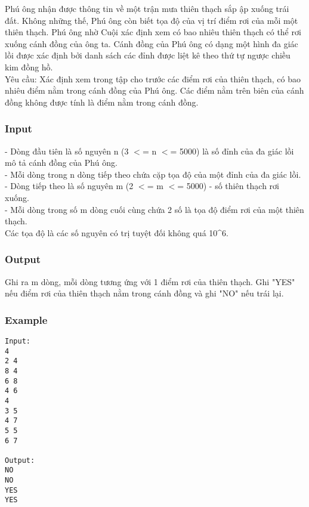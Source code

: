 



   Phú ông nhận được thông tin về một trận mưa thiên thạch sắp ập xuống trái đất. Không những thế, Phú ông còn biết tọa độ của vị trí điểm rơi của mỗi một thiên thạch. Phú ông nhờ Cuội xác định xem có bao nhiêu thiên thạch có thể rơi xuống cánh đồng của ông ta. Cánh đồng của Phú ông có dạng một hình đa giác lồi được xác định bởi danh sách các đỉnh được liệt kê theo thứ tự ngược chiều kim đồng hồ.   
\\       Yêu cầu:      Xác định xem trong tập cho trước các điểm rơi của thiên thạch, có bao nhiêu điểm nằm trong cánh đồng của Phú ông. Các điểm nằm trên biên của cánh đồng không được tính là điểm nằm trong cánh đồng.  

\subsubsection{   Input  }

   - Dòng đầu tiên là số nguyên n (3 $<$= n $<$= 5000) là số đỉnh của đa giác lồi mô tả cánh đồng của Phú ông.   
\\   - Mỗi dòng trong n dòng tiếp theo chứa cặp tọa độ của một đỉnh của đa giác lồi.   
\\   - Dòng tiếp theo là số nguyên m (2 $<$= m $<$= 5000) - số thiên thạch rơi xuống.   
\\   - Mỗi dòng trong số m dòng cuối cùng chứa 2 số là tọa độ điểm rơi của một thiên thạch.   
\\   Các tọa độ là các số nguyên có trị tuyệt đối không quá 10\textasciicircum6.  

\subsubsection{   Output  }

   Ghi ra m dòng, mỗi dòng tương ứng với 1 điểm rơi của thiên thạch. Ghi "YES" nếu điểm rơi của thiên thạch nằm trong cánh đồng và ghi "NO" nếu trái lại.  

\subsubsection{   Example  }
\begin{verbatim}
Input:
4
2 4
8 4
6 8
4 6
4
3 5
4 7
5 5
6 7

Output:
NO
NO
YES
YES
\end{verbatim}